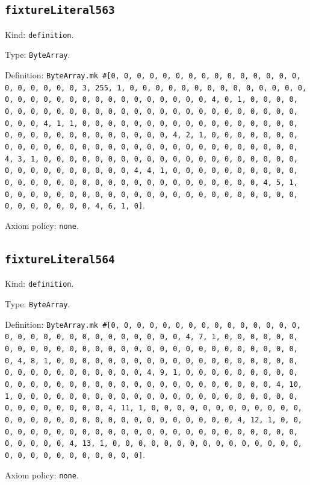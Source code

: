 \documentclass[11pt]{article}
\begin{document}
\subsection*{\texttt{fixtureLiteral563}}
\noindent Kind: \texttt{definition}.\par
\noindent Type: \texttt{ByteArray}.\par
\noindent Definition: \texttt{ByteArray.mk \#[0, 0, 0, 0, 0, 0, 0, 0, 0, 0, 0, 0, 0, 0, 0, 0, 0, 0, 0, 0, 0, 3, 255, 1, 0, 0, 0, 0, 0, 0, 0, 0, 0, 0, 0, 0, 0, 0, 0, 0, 0, 0, 0, 0, 0, 0, 0, 0, 0, 0, 0, 0, 0, 0, 4, 0, 1, 0, 0, 0, 0, 0, 0, 0, 0, 0, 0, 0, 0, 0, 0, 0, 0, 0, 0, 0, 0, 0, 0, 0, 0, 0, 0, 0, 0, 0, 0, 4, 1, 1, 0, 0, 0, 0, 0, 0, 0, 0, 0, 0, 0, 0, 0, 0, 0, 0, 0, 0, 0, 0, 0, 0, 0, 0, 0, 0, 0, 0, 0, 0, 4, 2, 1, 0, 0, 0, 0, 0, 0, 0, 0, 0, 0, 0, 0, 0, 0, 0, 0, 0, 0, 0, 0, 0, 0, 0, 0, 0, 0, 0, 0, 0, 0, 4, 3, 1, 0, 0, 0, 0, 0, 0, 0, 0, 0, 0, 0, 0, 0, 0, 0, 0, 0, 0, 0, 0, 0, 0, 0, 0, 0, 0, 0, 0, 0, 0, 4, 4, 1, 0, 0, 0, 0, 0, 0, 0, 0, 0, 0, 0, 0, 0, 0, 0, 0, 0, 0, 0, 0, 0, 0, 0, 0, 0, 0, 0, 0, 0, 0, 4, 5, 1, 0, 0, 0, 0, 0, 0, 0, 0, 0, 0, 0, 0, 0, 0, 0, 0, 0, 0, 0, 0, 0, 0, 0, 0, 0, 0, 0, 0, 0, 0, 4, 6, 1, 0]}.\par
\noindent Axiom policy: \texttt{none}.\par
\subsection*{\texttt{fixtureLiteral564}}
\noindent Kind: \texttt{definition}.\par
\noindent Type: \texttt{ByteArray}.\par
\noindent Definition: \texttt{ByteArray.mk \#[0, 0, 0, 0, 0, 0, 0, 0, 0, 0, 0, 0, 0, 0, 0, 0, 0, 0, 0, 0, 0, 0, 0, 0, 0, 0, 0, 0, 0, 4, 7, 1, 0, 0, 0, 0, 0, 0, 0, 0, 0, 0, 0, 0, 0, 0, 0, 0, 0, 0, 0, 0, 0, 0, 0, 0, 0, 0, 0, 0, 0, 0, 4, 8, 1, 0, 0, 0, 0, 0, 0, 0, 0, 0, 0, 0, 0, 0, 0, 0, 0, 0, 0, 0, 0, 0, 0, 0, 0, 0, 0, 0, 0, 0, 0, 4, 9, 1, 0, 0, 0, 0, 0, 0, 0, 0, 0, 0, 0, 0, 0, 0, 0, 0, 0, 0, 0, 0, 0, 0, 0, 0, 0, 0, 0, 0, 0, 0, 4, 10, 1, 0, 0, 0, 0, 0, 0, 0, 0, 0, 0, 0, 0, 0, 0, 0, 0, 0, 0, 0, 0, 0, 0, 0, 0, 0, 0, 0, 0, 0, 0, 4, 11, 1, 0, 0, 0, 0, 0, 0, 0, 0, 0, 0, 0, 0, 0, 0, 0, 0, 0, 0, 0, 0, 0, 0, 0, 0, 0, 0, 0, 0, 0, 0, 4, 12, 1, 0, 0, 0, 0, 0, 0, 0, 0, 0, 0, 0, 0, 0, 0, 0, 0, 0, 0, 0, 0, 0, 0, 0, 0, 0, 0, 0, 0, 0, 0, 4, 13, 1, 0, 0, 0, 0, 0, 0, 0, 0, 0, 0, 0, 0, 0, 0, 0, 0, 0, 0, 0, 0, 0, 0, 0, 0, 0, 0]}.\par
\noindent Axiom policy: \texttt{none}.\par
\end{document}
